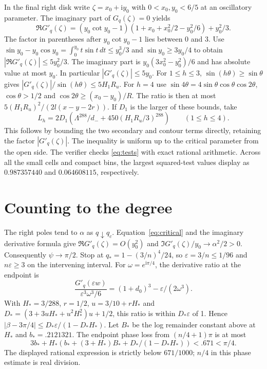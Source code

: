 \documentclass[11pt]{article}
\newcommand{\e}{\varepsilon}
\newcommand{\ip}{\mathrm i}
\begin{document}
In the final right disk write $\zeta=x_0+\ip y_0$ with
$0<x_0,y_0<6/5$ at an oscillatory parameter.
The imaginary part of $G_q(\zeta)=0$ yields
\begin{equation}\label{eq:critical}
 \Re G'_q(\zeta)
 =(y_0\cot y_0-1)(1+x_0+x_0^2/2-y_0^2/6)+y_0^2/3 .
\end{equation}
The factor in parentheses after $y_0\cot y_0-1$ lies
between 0 and 3. Use
$\sin y_0-y_0\cos y_0=\int_0^{y_0} t\sin t\,dt\le y_0^3/3$
and $\sin y_0\ge3y_0/4$ to obtain
$|\Re G'_q(\zeta)|\le5y_0^2/3$.
The imaginary part is $y_0(3x_0^2-y_0^2)/6$ and has
absolute value at most $y_0$. In particular
$|G'_q(\zeta)|\le5y_0$. For $1\le h\le3$,
$\sin(h\theta)\ge\sin\theta$ gives
$|G'_q(\zeta)|/\sin(h\theta)\le 5H_1R_u$.
For $h=4$ use
$\sin4\theta=4\sin\theta\cos\theta\cos2\theta$,
$\cos\theta>1/2$ and $\cos2\theta\ge(x_0-y_0)/R$.
The ratio is then at most $5(H_1R_u)^2/(2l(x-y-2r))$.
If $D_1$ is the larger of these bounds, take
\[
 L_h=2D_1\left(\Lambda^{288}/d_-+
                 450(H_1R_u/3)^{288}\right)
 \qquad(1\le h\le4).
\]
This follows by bounding the two secondary and contour
terms directly, retaining the factor $|G'_q(\zeta)|$.
The inequality is uniform up to the critical parameter
from the open side. The verifier checks \eqref{eq:tests}
with exact rational arithmetic. Across all the small cells
and compact bins, the largest squared-test values display
as $0.987357440$ and $0.064608115$, respectively.

\section{Counting to the degree}
The right poles tend to $\alpha$ as $q\downarrow q_c$.
Equation~\eqref{eq:critical} and the imaginary derivative
formula give $\Re G'_q(\zeta)=O(y_0^2)$ and
$\Im G'_q(\zeta)/y_0\to\alpha^2/2>0$.
Consequently $\psi\to\pi/2$.
Stop at $q_*=1-(3/n)^4/24$, so $\e=3/n\le1/96$ and
$n\e\ge3$ on the intervening interval.
For $\omega=e^{\ip\pi/4}$, the derivative ratio at the endpoint is
\[
 \frac{G'_q(\e w)}{\e^3\omega^3/6}
 =(1+d_0)^3-\e/(2\omega^3).
\]
With $H_*=3/288$, $r=1/2$, $u=3/10+rH_*$ and
$D_*=(3+3uH_*+u^2H_*^2)u+1/2$, this ratio is within
$D_*\e$ of 1. Hence
$|\beta-3\pi/4|\le D_*\e/(1-D_*H_*)$.
Let $B_*$ be the log remainder constant above at $H_*$ and
$b_*=.2121321$. The endpoint phase loss from
$(n/4+1)\pi$ is at most
\[
 3b_*+H_*\left(b_*+(3+H_*)B_*+D_* /(1-D_*H_*)\right)
 <.671<\pi/4 .
\]
The displayed rational expression is strictly below $671/1000$;
$n/4$ in this phase estimate is real division.
\end{document}
